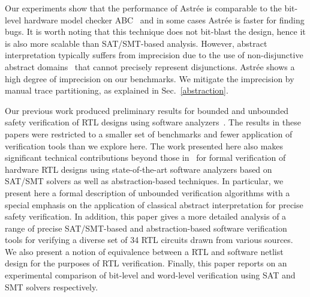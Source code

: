 Our experiments show that the performance of Astr{\'e}e is comparable to the
bit-level hardware model checker ABC~\cite{abc} and in some cases Astr{\'e}e
is faster for finding bugs.  It is worth noting that this technique does not
bit-blast the design, hence it is also more scalable than SAT/SMT-based
analysis.  However, abstract interpretation typically suffers from
imprecision due to the use of non-disjunctive abstract domains~\cite{nd}
that cannot precisely represent disjunctions.  Astr{\'e}e shows a high
degree of imprecision on our benchmarks.  We mitigate the imprecision by
manual trace partitioning, as explained in Sec.\ \ref{abstraction}.


Our previous work produced preliminary results 
for bounded and unbounded safety verification of RTL designs using 
software analyzers~\cite{mkm2015,mskm2016}.  
The results in these papers were restricted to a smaller set 
of benchmarks and fewer application of verification tools than we
explore here.  
The work presented here also makes significant technical contributions 
beyond those in~\cite{mkm2015,mskm2016} for formal 
verification of hardware RTL designs using state-of-the-art software analyzers 
based on SAT/SMT solvers as well as abstraction-based techniques. 
In particular, we present here a formal description of unbounded 
verification algorithms with a special emphasis on the application of  
classical abstract interpretation for precise safety verification.  In addition, 
this paper gives a more detailed analysis of a range of precise SAT/SMT-based 
and abstraction-based software verification tools for verifying a diverse set of 34 RTL 
circuits drawn from various sources.  We also present a notion of 
equivalence between a RTL and software netlist design for the purposes of RTL 
verification.  Finally, this paper reports on an experimental comparison of
bit-level and word-level verification using SAT and SMT solvers respectively. 


